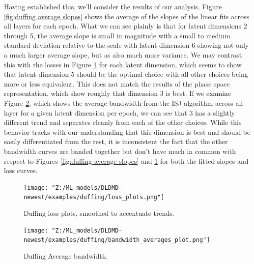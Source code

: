Having established this, we'll consider the results of our analysis.
Figure \ref{fig:duffing average slopes} shows the average of the slopes of the linear fits across 
all layers for each epoch.  What we can see plainly is that for latent dimensions 2 through 5, the average
slope is small in magnitude with a small to medium standard deviation relative to the scale with
latent dimension 6 showing not only a much larger average slope, but as also much more variance. We may 
contrast this with the losses in Figure \ref{fig:duffing losses} for each latent dimension, which seems 
to show that latent dimension 5 should be the optimal choice with all other choices being more or less 
equivalent. This does not match the results of the phase space representation, which show roughly that 
dimension 3 is best. 
If we examine Figure \ref{fig:duffing average bandwidth}, which shows the average bandwidth from the ISJ
algorithm across all layer for a given latent dimension per epoch, we can see that 3 has a slightly
different trend and separates cleanly from each of the other choices. While this behavior tracks with our 
understanding that this dimension is best and should be easily differentiated from the rest, it is 
inconsistent the fact that the other bandwidth curves are banded together but don't have much in common
with respect to Figures \ref{fig:duffing average slopes} and \ref{fig:duffing losses}
for both the fitted slopes and loss curves.


\begin{figure}[!ht]
    \centering
    \begin{minipage}{\textwidth}
        \texttt{[image: "Z:/ML\_models/DLDMD-newest/examples/duffing/loss\_plots.png"]} 
    \end{minipage}%
    \caption{Duffing loss plots, smoothed to accentuate trends.}
    \label{fig:duffing losses}
\end{figure}

\begin{figure}[!ht]
    \centering
    \begin{minipage}{\textwidth}
        \texttt{[image: "Z:/ML\_models/DLDMD-newest/examples/duffing/bandwidth\_averages\_plot.png"]} 
    \end{minipage} 
    \caption{Duffing Average bandwidth.}
    \label{fig:duffing average bandwidth}
\end{figure}

